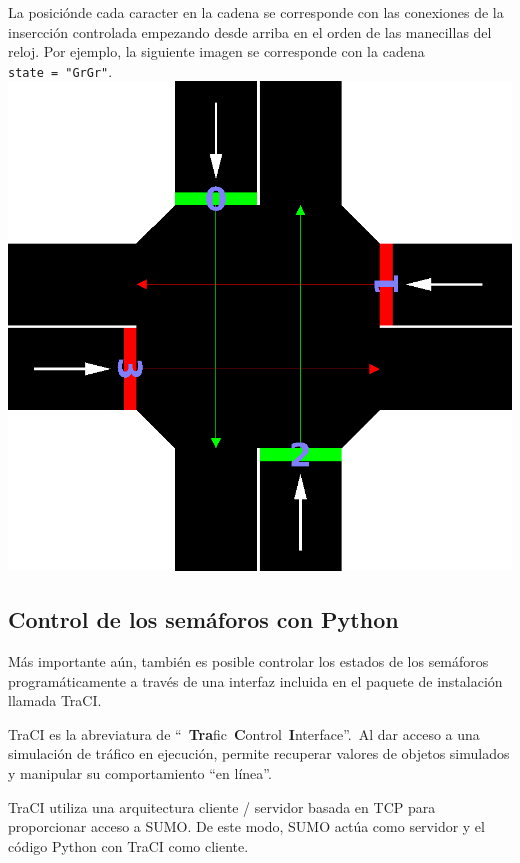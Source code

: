La posiciónde cada caracter en la cadena se corresponde con las
conexiones de la insercción controlada empezando desde arriba en el
orden de las manecillas del reloj. Por ejemplo, la siguiente imagen se
corresponde con la cadena \texttt{state\ =\ "GrGr"}.
\includegraphics[width=\textwidth]{sumo/tls_light_order.png}

\hypertarget{control-de-los-semuxe1foros-con-python}{%
\subsection{Control de los semáforos con
Python}\label{control-de-los-semuxe1foros-con-python}}

Más importante aún, también es posible controlar los estados de los
semáforos programáticamente a través de una interfaz incluida en el
paquete de instalación llamada TraCI.

TraCI es la abreviatura de
``~\textbf{Tra}fic~\textbf{C}ontrol~\textbf{I}nterface''.~Al dar acceso
a una simulación de tráfico en ejecución, permite recuperar valores de
objetos simulados y manipular su comportamiento ``en línea''.

TraCI utiliza una arquitectura cliente / servidor basada en TCP para
proporcionar acceso a SUMO. De este modo, SUMO actúa como servidor y el
código Python con TraCI como cliente.

